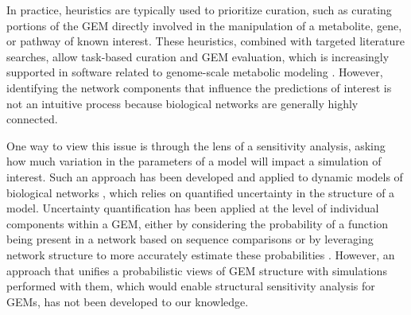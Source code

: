 \documentclass[11pt,onecolumn,notitlepage,openany,twoside]{book}
\begin{document}
\begin{refsection}
In practice, heuristics are typically used to prioritize curation, such as curating portions of the GEM directly involved in the manipulation of a metabolite, gene, or pathway of known interest. These heuristics, combined with targeted literature searches, allow task-based curation and GEM evaluation, which is increasingly supported in software related to genome-scale metabolic modeling \cite{Lieven2018-fo, Wang2018-yn}. However, identifying the network components that influence the predictions of interest is not an intuitive process because biological networks are generally highly connected.

One way to view this issue is through the lens of a sensitivity analysis, asking how much variation in the parameters of a model will impact a simulation of interest. Such an approach has been developed and applied to dynamic models of biological networks \cite{Babtie2014-vy}, which relies on quantified uncertainty in the structure of a model. Uncertainty quantification has been applied at the level of individual components within a GEM, either by considering the probability of a function being present in a network based on sequence comparisons \cite{Benedict2014-yo} or by leveraging network structure to more accurately estimate these probabilities \cite{Plata2012-ys}. However, an approach that unifies a probabilistic views of GEM structure with simulations performed with them, which would enable structural sensitivity analysis for GEMs, has not been developed to our knowledge.


\end{refsection}
\end{document}
